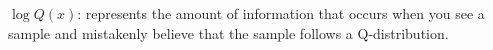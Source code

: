 \documentclass[preview]{standalone}
\begin{document}
\begin{center}
$\log Q(x)$: represents the amount of information that occurs when you see a sample and mistakenly believe that the sample follows a Q-distribution.
\end{center}
\end{document}
